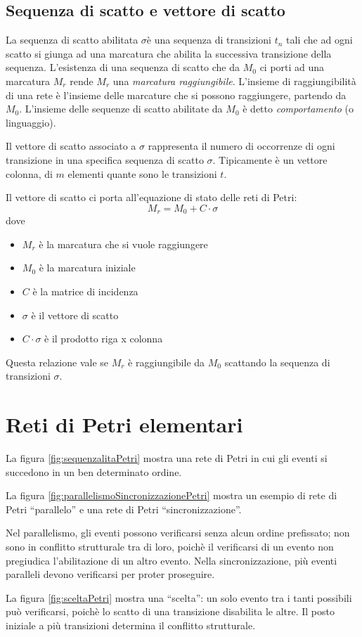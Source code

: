 \documentclass[a4paper]{report}
\begin{document}
\subsection{Sequenza di scatto e vettore di scatto}
La sequenza di scatto abilitata $\sigma$\`e una sequenza di
transizioni $t_n$ tali che ad ogni scatto si giunga ad una marcatura
che abilita la successiva transizione della sequenza. 
L'esistenza di una sequenza di scatto che da $M_0$ ci porti ad una
marcatura $M_r$ rende $M_r$ una {\em marcatura
  raggiungibile}. L'insieme di
raggiungibilit\`a di una rete \`e l'insieme delle marcature che si
possono raggiungere, partendo da $M_0$. L'insieme delle sequenze di
scatto abilitate da $M_0$ \`e detto {\em
  comportamento} (o linguaggio). 

Il vettore di scatto associato a $\sigma$ rappresenta il numero di
occorrenze di ogni transizione in una specifica sequenza di
scatto $\sigma$. Tipicamente \`e un vettore colonna, di $m$ elementi
quante sono le transizioni $t$. 

Il vettore di scatto ci porta all'equazione di stato delle reti di
Petri:
\begin{equation}
  M_r = M_0 + C \cdot \sigma
\end{equation}
dove
\begin{itemize}
\item $M_r$ \`e la marcatura che si vuole raggiungere
\item $M_0$ \`e la marcatura iniziale
\item $C$ \`e la matrice di incidenza
\item $\sigma$ \`e il vettore di scatto
\item $C \cdot \sigma$ \`e il prodotto riga x colonna
\end{itemize}
Questa relazione vale se $M_r$ \`e raggiungibile da $M_0$ scattando la
sequenza di transizioni $\sigma$.

\section{Reti di Petri elementari}
La figura \ref{fig:sequenzalitaPetri} mostra una rete di Petri in cui
gli eventi si succedono in un ben determinato ordine.

La figura \ref{fig:parallelismoSincronizzazionePetri} mostra un
esempio di rete di Petri ``parallelo'' e una rete di Petri
``sincronizzazione''. 

Nel parallelismo, gli eventi possono verificarsi senza alcun ordine
prefissato; non sono in conflitto strutturale tra di loro, poich\`e il
verificarsi di un evento non pregiudica l'abilitazione di un altro
evento. Nella sincronizzazione, pi\`u eventi paralleli devono
verificarsi per proter proseguire.

La figura \ref{fig:sceltaPetri} mostra una ``scelta'': un solo evento
tra i tanti possibili pu\`o verificarsi, poich\`e lo scatto di una
transizione disabilita le altre. Il posto iniziale a pi\`u transizioni
determina il conflitto strutturale.
\end{document}
